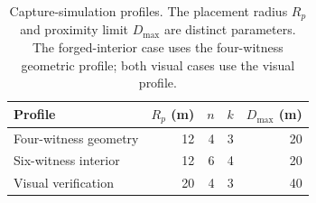 \begin{table}[htbp]
    \centering
    \caption{Capture-simulation profiles. The placement radius \(R_p\) and proximity limit \(D_{\max}\) are distinct parameters. The forged-interior case uses the four-witness geometric profile; both visual cases use the visual profile.}
    \label{tab:capture-simulation-parameters}
    \begin{tabular}{lrrrr}
        \toprule
        \textbf{Profile} & \(R_p\) (m) & \(n\) & \(k\) & \(D_{\max}\) (m) \\
        \midrule
        Four-witness geometry & 12 & 4 & 3 & 20 \\
        Six-witness interior & 12 & 6 & 4 & 20 \\
        Visual verification & 20 & 4 & 3 & 40 \\
        \bottomrule
    \end{tabular}
\end{table}
